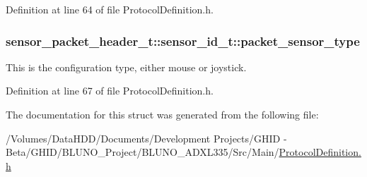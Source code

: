 \-Definition at line 64 of file \-Protocol\-Definition.\-h.

\hypertarget{structsensor__packet__header__t_1_1sensor__id__t_ac75342f878e2f127ddd4217eb3857a0b}{
\subsubsection[{packet\-\_\-sensor\-\_\-type}]{ {\bf sensor\-\_\-packet\-\_\-header\-\_\-t\-::sensor\-\_\-id\-\_\-t\-::packet\-\_\-sensor\-\_\-type}}}\label{structsensor__packet__header__t_1_1sensor__id__t_ac75342f878e2f127ddd4217eb3857a0b}


\-This is the configuration type, either mouse or joystick. 



\-Definition at line 67 of file \-Protocol\-Definition.\-h.



\-The documentation for this struct was generated from the following file\-:\begin{DoxyCompactItemize}
\item 
/\-Volumes/\-Data\-H\-D\-D/\-Documents/\-Development Projects/\-G\-H\-I\-D -\/ Beta/\-G\-H\-I\-D/\-B\-L\-U\-N\-O\-\_\-\-Project/\-B\-L\-U\-N\-O\-\_\-\-A\-D\-X\-L335/\-Src/\-Main/\hyperlink{_protocol_definition_8h}{\-Protocol\-Definition.\-h}\end{DoxyCompactItemize}
